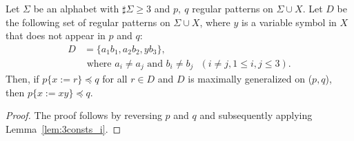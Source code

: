 
\begin{lem}\label{lem:3consts_ii}
  Let $\Sigma$ be an alphabet with $\sharp\Sigma \ge 3$ and $p,~q$ regular patterns on $\Sigma\cup X$.
  Let $D$ be the following set of regular patterns on $\Sigma\cup X$, where $y$ is a variable symbol in $X$ that does not appear in $p$ and $q$:
  \begin{align*}
  D & = \{ a_{1}b_{1}, a_{2}b_{2}, yb_{3}\},\\
  & \mbox{ where } a_{i} \ne a_{j} \mbox{ and } b_{i} \ne b_{j} \mbox{ } (i\ne j, 1\le i,j\le 3).
  \end{align*}
  Then, if $p \{ x := r \} \preceq q$ for all $r \in D$ and $D$ is maximally generalized on ($p,q$), then $p \{ x := xy \} \preceq q$.
\end{lem}

\begin{proof}
%
%
The proof follows by reversing $p$ and $q$ and subsequently applying Lemma~\ref{lem:3consts_i}.
\end{proof}

